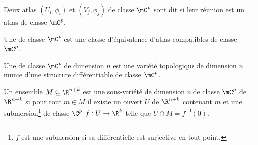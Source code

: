 \begin{definition}
{
	}
\end{definition}

\begin{definition}
	Deux atlas $(U_{i}, \phi_{i})$ et $(V_{j}, \phi_{j})$ de classe $\mC^{p}$ sont dit 
	si leur réunion est un atlas de classe $\mC^{p}$.

	Une  de classe $\mC^{p}$ est une classe d'équivalence d'atlas compatibles
	de classe $\mC^{p}$.
\end{definition}

\begin{definition}
	Une  de classe $\mC^{p}$ de dimension $n$ est une variété topologique de
	dimension $n$ munie d'une structure différentiable de classe $\mC^{p}$.
\end{definition}

\begin{definition}
	Un ensemble $M \subseteq \R^{n + k}$ est une sous-variété de dimension $n$ de classe $\mC^{p}$ de
	$\R^{n + k}$ si pour tout $m \in M$ il existe un ouvert $U$ de $\R^{n + k}$ contenant $m$ et une
	submersion\footnote{$f$ est une submersion si sa différentielle est surjective en tout point.}
	de classe $\C^{p}$ $f: U \to \R^{k}$ telle que $U \cap M = f^{- 1}(0)$.
\end{definition}

